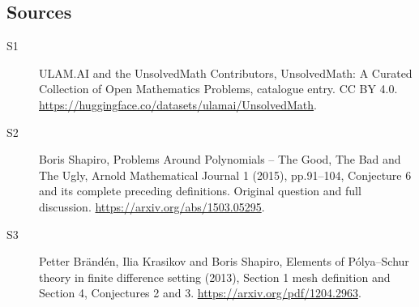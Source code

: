 \documentclass[11pt]{article}
\begin{document}
\subsection{Sources}
\begin{description}
\item[\hypertarget{source:statement:1}{S1}] ULAM.AI and the UnsolvedMath Contributors, UnsolvedMath: A Curated Collection of Open Mathematics Problems, catalogue entry. CC BY 4.0. \url{https://huggingface.co/datasets/ulamai/UnsolvedMath}.
\item[\hypertarget{source:statement:2}{S2}] Boris Shapiro, Problems Around Polynomials -- The Good, The Bad and The Ugly, Arnold Mathematical Journal 1 (2015), pp.91--104, Conjecture 6 and its complete preceding definitions. Original question and full discussion. \url{https://arxiv.org/abs/1503.05295}.
\item[\hypertarget{source:statement:3}{S3}] Petter Brändén, Ilia Krasikov and Boris Shapiro, Elements of Pólya--Schur theory in finite difference setting (2013), Section 1 mesh definition and Section 4, Conjectures 2 and 3. \url{https://arxiv.org/pdf/1204.2963}.
\end{description}
\label{end:statement}
\end{document}
